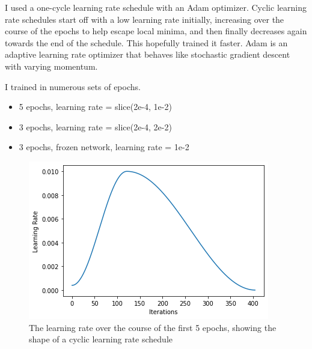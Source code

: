 \documentclass[12pt,letterpaper]{hmcpset}
\begin{document}
I used a one-cycle learning rate schedule with an Adam optimizer.
Cyclic learning rate schedules start off with a low learning rate initially, increasing over the course of the epochs to help escape local minima, and then finally decreases again towards the end of the schedule.
This hopefully trained it faster.
Adam is an adaptive learning rate optimizer that behaves like stochastic gradient descent with varying momentum.

I trained in numerous sets of epochs.
\begin{itemize}
    \item 5 epochs, learning rate = slice(2e-4, 1e-2)
    \item 3 epochs, learning rate = slice(2e-4, 2e-2)
    \item 3 epochs, frozen network, learning rate = 1e-2
\end{itemize}

\begin{figure}
    \centering
    \includegraphics[width=\textwidth]{cycliclr}
    \caption{The learning rate over the course of the first 5 epochs, showing the shape of a cyclic learning rate schedule}
\end{figure}
\end{document}
